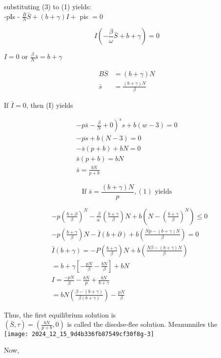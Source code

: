 \documentclass[10pt]{article}
\begin{document}
substituting (3) to (1) yields:\\
-pIs - $\frac{B}{N} \bar{S}+(b+\gamma) I+$ pis $=0$

$$
I\left(-\frac{\beta}{\omega} \bar{S}+b+\gamma\right)=0
$$

$I=0$ or $\frac{\beta}{N} \bar{s}=b+\gamma$

$$
\begin{aligned}
B \bar{S} & =(b+\gamma) N \\
\bar{s} & =\frac{(b+\gamma) N}{\beta}
\end{aligned}
$$

If $\bar{I}=0$, then (I) yields

$$
\begin{gathered}
\left.-p \bar{s}-\frac{\beta}{N}+0\right)^{s} s+b(w-3)=0 \\
-\overline{p s}+b(N-3)=0 \\
-\bar{s}(p+b)+b N=0 \\
\bar{s}(p+b)=b N \\
\bar{s}=\frac{b N}{p+b}
\end{gathered}
$$

$$
\text { If } \bar{s}=\frac{(b+\gamma) N}{p},(1) \text { yields }
$$

$$
\begin{aligned}
& -p\left(\frac{b+\partial}{\beta}\right)^{N}-\frac{\beta}{\alpha^{\prime}}\left(\frac{b+\gamma}{\beta}\right) N+b\left(N-\left(\frac{b+\gamma}{\beta}\right)^{N}\right) \leq 0 \\
& -p\left(\frac{b+\gamma}{\beta}\right) N-\bar{I}(b+\partial)+b\left(\frac{N p-(b+\gamma) N}{\beta}\right)=0 \\
& \bar{I}(b+\gamma)=-P\left(\frac{b+\gamma}{\beta}\right) N+b\left(\frac{N \beta-(b+\gamma) N}{\beta}\right) \\
& =b+\gamma\left[-\frac{p N}{\beta}-\frac{b N}{\beta}\right]+b N \\
& I=\frac{-p N}{\beta}-\frac{b N}{p}+\frac{b N}{b+\gamma} \\
& =b N\left(\frac{\beta-(b+\gamma)}{\beta(b+\gamma)}\right)-\frac{p N}{\beta}
\end{aligned}
$$

Thus, the first equilibrium solution is\\
$(\bar{S}, \tau)=\left(\frac{b N}{p+b}, 0\right)$ is called the disedse-flee solution. Meanunniles the\\
\texttt{[image: 2024\_12\_15\_9d4b336fb87549cf30f8g-3]}

Now,
\end{document}
